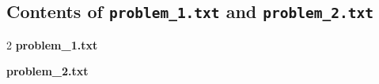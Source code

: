 \documentclass[10pt,a4paper]{article}
\begin{document}
\subsection{Contents of \texttt{problem\_1.txt} and \texttt{problem\_2.txt}}
\begin{multicols}{2}
\noindent\textbf{\small problem\_1.txt}\par\smallskip

\columnbreak
\noindent\textbf{\small problem\_2.txt}\par\smallskip

\end{multicols}
\lstset{frame=single,basicstyle=\ttfamily\footnotesize}

\end{document}
